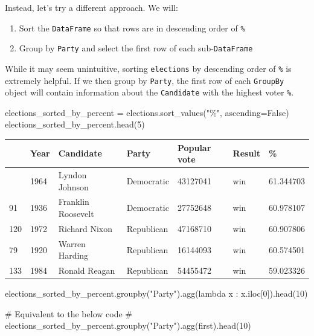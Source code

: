 \documentclass[
  letterpaper,
  DIV=11,
  numbers=noendperiod]{scrreprt}
\newenvironment{Shaded}{\begin{snugshade}}{\end{snugshade}}
\newcommand{\CommentTok}[1]{\textcolor[rgb]{0.37,0.37,0.37}{#1}}
\newcommand{\DecValTok}[1]{\textcolor[rgb]{0.68,0.00,0.00}{#1}}
\newcommand{\KeywordTok}[1]{\textcolor[rgb]{0.00,0.23,0.31}{#1}}
\newcommand{\NormalTok}[1]{\textcolor[rgb]{0.00,0.23,0.31}{#1}}
\newcommand{\OperatorTok}[1]{\textcolor[rgb]{0.37,0.37,0.37}{#1}}
\newcommand{\StringTok}[1]{\textcolor[rgb]{0.13,0.47,0.30}{#1}}
\newcommand{\VariableTok}[1]{\textcolor[rgb]{0.07,0.07,0.07}{#1}}
\providecommand{\tightlist}{%
  \setlength{\itemsep}{0pt}\setlength{\parskip}{0pt}}\usepackage{longtable,booktabs,array}
\begin{document}
Instead, let's try a different approach. We will:

\begin{enumerate}
\def\labelenumi{\arabic{enumi}.}
\tightlist
\item
  Sort the \texttt{DataFrame} so that rows are in descending order of
  \texttt{\%}
\item
  Group by \texttt{Party} and select the first row of each
  sub-\texttt{DataFrame}
\end{enumerate}

While it may seem unintuitive, sorting \texttt{elections} by descending
order of \texttt{\%} is extremely helpful. If we then group by
\texttt{Party}, the first row of each \texttt{GroupBy} object will
contain information about the \texttt{Candidate} with the highest voter
\texttt{\%}.

\begin{Shaded}
\begin{Highlighting}[]
\NormalTok{elections\_sorted\_by\_percent }\OperatorTok{=}\NormalTok{ elections.sort\_values(}\StringTok{"\%"}\NormalTok{, ascending}\OperatorTok{=}\VariableTok{False}\NormalTok{)}
\NormalTok{elections\_sorted\_by\_percent.head(}\DecValTok{5}\NormalTok{)}
\end{Highlighting}
\end{Shaded}

\begin{longtable}[]{@{}lllllll@{}}
\toprule\noalign{}
& Year & Candidate & Party & Popular vote & Result & \% \\
\midrule\noalign{}
\endhead
\bottomrule\noalign{}
\endlastfoot
114 & 1964 & Lyndon Johnson & Democratic & 43127041 & win & 61.344703 \\
91 & 1936 & Franklin Roosevelt & Democratic & 27752648 & win &
60.978107 \\
120 & 1972 & Richard Nixon & Republican & 47168710 & win & 60.907806 \\
79 & 1920 & Warren Harding & Republican & 16144093 & win & 60.574501 \\
133 & 1984 & Ronald Reagan & Republican & 54455472 & win & 59.023326 \\
\end{longtable}

\begin{Shaded}
\begin{Highlighting}[]
\NormalTok{elections\_sorted\_by\_percent.groupby(}\StringTok{"Party"}\NormalTok{).agg(}\KeywordTok{lambda}\NormalTok{ x : x.iloc[}\DecValTok{0}\NormalTok{]).head(}\DecValTok{10}\NormalTok{)}

\CommentTok{\# Equivalent to the below code}
\CommentTok{\# elections\_sorted\_by\_percent.groupby("Party").agg(\textquotesingle{}first\textquotesingle{}).head(10)}
\end{Highlighting}
\end{Shaded}
\end{document}
